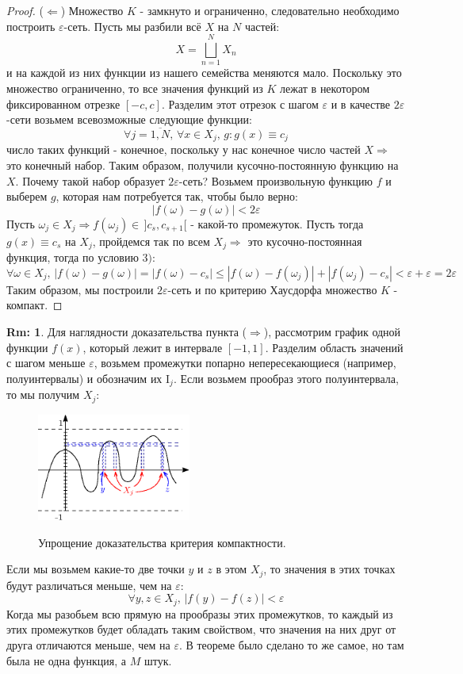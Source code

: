 \documentclass[12pt]{article}
\newcommand{\MI}{\mathrm{I}}
\newcommand{\VE}{\varepsilon}
\theoremstyle{definition}
\newtheorem{rem}{Rm:}
\begin{document}
\begin{proof}
	($\Leftarrow$) Множество $K$ - замкнуто и ограниченно, следовательно необходимо построить $\VE$-сеть. Пусть мы разбили всё $X$ на $N$ частей: $$
		X = \bigsqcup\limits_{n = 1}^N X_n
	$$ 
	и на каждой из них функции из нашего семейства меняются мало. Поскольку это множество ограниченно, то все значения функций из $K$ лежат в некотором фиксированном отрезке $[-c,c]$. Разделим этот отрезок с шагом $\VE$ и в качестве $2\VE$-сети возьмем всевозможные следующие функции:
	$$
		 \forall j = \overline{1,N}, \, \forall x \in X_j, \, g \colon g(x) \equiv c_j
	$$
	число таких функций - конечное, поскольку у нас конечное число частей $X \Rightarrow$ это конечный набор. Таким образом, получили кусочно-постоянную функцию на $X$. Почему такой набор образует $2\VE$-сеть? Возьмем произвольную функцию $f$ и выберем $g$, которая нам потребуется так, чтобы было верно:
	$$
		|f(\omega) - g(\omega)| < 2\VE
	$$
	Пусть $\omega_j \in X_j \Rightarrow f(\omega_j) \in \, ]c_s, c_{s+1}[$ - какой-то промежуток. Пусть тогда $g(x) \equiv c_s$ на $X_j$, пройдемся так по всем $X_j \Rightarrow$ это кусочно-постоянная функция, тогда по условию $3)$:
	$$
		\forall \omega \in X_j, \, |f(\omega) - g(\omega)| = |f(\omega) - c_s| \leq |f(\omega) - f(\omega_j)| + |f(\omega_j) - c_s| < \VE + \VE = 2\VE
	$$
	Таким образом, мы построили $2\VE$-сеть и по критерию Хаусдорфа множество $K$ - компакт.
\end{proof}
\begin{rem}
	Для наглядности доказательства пункта ($\Rightarrow$), рассмотрим график одной функции $f(x)$, который лежит в интервале $[-1,1]$. Разделим область значений с шагом меньше $\VE$, возьмем промежутки попарно непересекающиеся (например, полуинтервалы) и обозначим их $\MI_j$. Если возьмем прообраз этого полуинтервала, то мы получим $X_j$:
	\begin{figure}[H]
		\centering
		\includegraphics[width=0.45\textwidth]{MA3L11_2.eps}
		\label{MA3L11_1}
		\caption{Упрощение доказательства критерия компактности.}
		\label{fig:Покрытие	}
	\end{figure}
	Если мы возьмем какие-то две точки $y$ и $z$ в этом $X_j$, то значения в этих точках будут различаться меньше, чем на $\VE$: 
	$$
		\forall y,z \in X_j, \,	|f(y) - f(z)| < \VE
	$$ 
	Когда мы разобьем всю прямую на прообразы этих промежутков, то каждый из этих промежутков будет обладать таким свойством, что значения на них друг от друга отличаются меньше, чем на $\VE$. В теореме было сделано то же самое, но там была не одна функция, а $M$ штук.
\end{rem}
\end{document}

